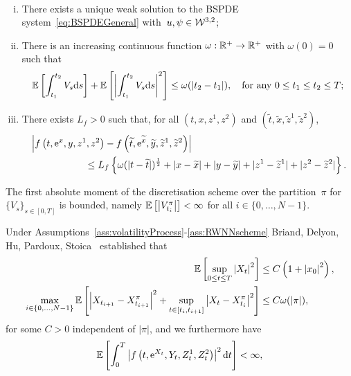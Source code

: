\begin{assumption}\label{ass:RWNNscheme}\
\begin{enumerate}[(i)]
    \item There exists a unique weak solution to the BSPDE system~\eqref{eq:BSPDEGeneral} with~${u, \psi \in \mathcal{W}^{3,2}}$;
    \item There is an increasing continuous function $\omega:\mathbb{R}^+ \rightarrow\mathbb{R}^+$ with $\omega(0)=0$ such that
    \[
    \mathbb{E}\left[\int_{t_1}^{t_2}V_s\mathrm{d} s\right] + \mathbb{E}\left[\left|\int_{t_1}^{t_2}V_s\mathrm{d} s\right|^2\right]\leq \omega(|t_2-t_1|),
    \quad \text{for any }0\leq t_1 \leq t_2 \leq T;
    \]
    \item There exists $L_f>0$ such that,
    for all $(t,x,z^1,z^2)$ and $(\widetilde{t},\widetilde{x},\widetilde{z}^1,\widetilde{z}^2)$,
    \begin{align}
    & \left|f\left(t, \mathrm{e}^x, y, z^1, z^2\right)
    -f\left(\widetilde{t}, \mathrm{e}^{\widetilde{x}},\widetilde{y},\widetilde{z}^1,\widetilde{z}^2\right)\right| \\
    & \hspace*{2cm} \leq L_f\left\{\omega(|t-\widetilde{t}|)^{\frac{1}{2}} + |x-\widetilde{x}| + |y-\widetilde y| + |z^1-\widetilde{z}^1| + |z^2-\widetilde{z}^2|\right\}.
    \end{align}
\end{enumerate}
\end{assumption}
\begin{assumption}\label{ass:discretisationbound}
The first absolute moment of the discretisation scheme over the partition~$\pi$ for $\{V_s\}_{s\in[0, T]}$ is bounded, namely $ \mathbb{E}\left[\left|V^\pi_{t_i}\right| \right] < \infty$ for all $i\in\{0,\dots, N-1\}.$
\end{assumption}
Under Assumptions~\ref{ass:volatilityProcess}-\ref{ass:RWNNscheme} Briand, Delyon, Hu, Pardoux, Stoica~\cite{Briand2003LpEquations} established that
\begin{align}
    \mathbb{E}\left[\sup _{0 \leq t \leq T}\left|X_{t}\right|^{2}\right] &\leq C\left(1+\left|x_{0}\right|^{2}\right),\label{eq:solution_moment_bound} \\
    \max_{i\in\{0,\dots,N-1\}} \mathbb{E}\left[\left|X_{t_{i+1}}-X^\pi_{t_{i+1}}\right|^{2}+\sup _{t \in\left[t_{i}, t_{i+1}\right]}\left|X_{t}-X^\pi_{t_{i}}\right|^{2}\right] &\leq C \omega(|\pi|),\label{eq:fwd_process_estimation}
\end{align}
for some $C>0$ independent of $|\pi|$,
and we furthermore have~\cite{Briand2003LpEquations}
\begin{equation}\label{eq:L2int_f}
\mathbb{E}\left[\int_{0}^{T}\left|f\left(t, \mathrm{e}^{X_{t}}, Y_{t}, Z^1_{t}, Z^2_{t}\right)\right|^{2} \mathrm{d} t\right]<\infty,
\end{equation}
